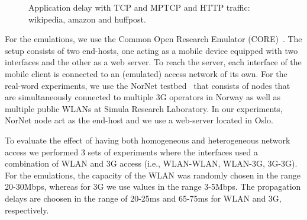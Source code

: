 \begin{figure}
  \centering
  \caption{Application delay with TCP and MPTCP and HTTP traffic: wikipedia, amazon and huffpost.}
  \label{fig:nornet_http_boxplot}
\end{figure}


For the emulations, we use the Common Open
Research Emulator (CORE)~\cite{CORE}. The setup consists of two end-hosts, one acting as a mobile
device equipped with two interfaces and the other as a web server. To reach the
server, each interface of the mobile client is connected to an (emulated) access
network of its own. For the real-word experiments, we use the NorNet testbed~\cite{PAMS2013-NorNet} that consists of nodes that are simultaneously connected to multiple 3G operators in Norway as well as multiple public WLANs at Simula Research Laboratory. In our experiments, NorNet node act as the end-host and we use a web-server located in Oslo.

To evaluate the effect of having both homogeneous and heterogeneous network access we performed 3 sets of experiments where the interfaces used a combination of WLAN and 3G access (i.e., WLAN-WLAN, WLAN-3G, 3G-3G). For the emulations, the capacity of the WLAN was randomly chosen in the range 20-30Mbps, whereas for 3G we use values in the range 3-5Mbps. The propagation delays are choosen in the range of 20-25ms and 65-75ms for WLAN and 3G, respectively.

